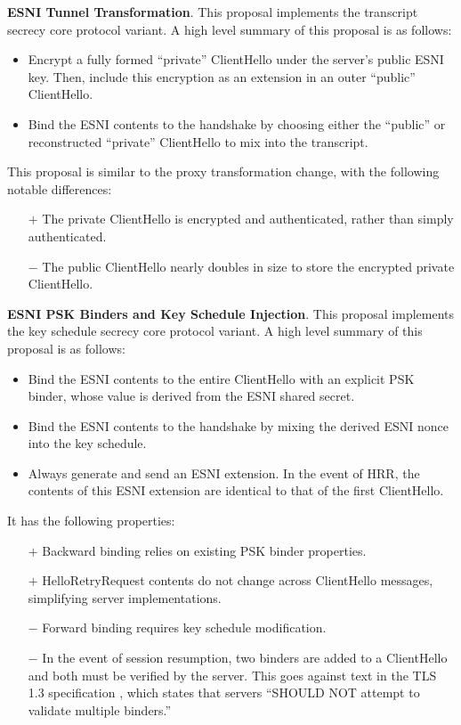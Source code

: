 \documentclass{article}
\theoremstyle{definition}
\theoremstyle{definition}
\begin{document}
\textbf{ESNI Tunnel Transformation}. This proposal implements the transcript secrecy core protocol variant. 
A high level summary of this proposal is as follows:
%
\begin{itemize}
  \item Encrypt a fully formed ``private'' ClientHello under the server's public ESNI key. Then, include
  this encryption as an extension in an outer ``public'' ClientHello.
  \item Bind the ESNI contents to the handshake by choosing either the ``public'' or reconstructed
  ``private'' ClientHello to mix into the transcript.
\end{itemize}
%
This proposal is similar to the proxy transformation change, with the following notable differences:
%
\begin{itemize}
  \item[$+$] The private ClientHello is encrypted and authenticated, rather than simply authenticated.
  \item[$-$] The public ClientHello nearly doubles in size to store the encrypted private ClientHello.
\end{itemize}
%

\textbf{ESNI PSK Binders and Key Schedule Injection}. This proposal implements the key schedule secrecy 
core protocol variant. A high level summary of this proposal is as follows:
%
\begin{itemize}
  \item Bind the ESNI contents to the entire ClientHello with an explicit PSK binder, whose value is
  derived from the ESNI shared secret.
  \item Bind the ESNI contents to the handshake by mixing the derived ESNI nonce into the key schedule.
  \item Always generate and send an ESNI extension. In the event of HRR, the contents of this ESNI 
  extension are identical to that of the first ClientHello.
\end{itemize}
%
It has the following properties:
%
\begin{itemize}
  \item[$+$] Backward binding relies on existing PSK binder properties.
  \item[$+$] HelloRetryRequest contents do not change across ClientHello messages, simplifying server
  implementations.
  \item[$-$] Forward binding requires key schedule modification.
  \item[$-$] In the event of session resumption, two binders are added to a ClientHello and both
  must be verified by the server. This goes against text in the TLS 1.3 specification \cite{rfc8446}, 
  which states that servers ``SHOULD NOT attempt to validate multiple binders.''
\end{itemize}
%



\end{document}
